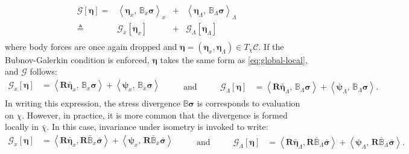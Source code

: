 \begin{equation}
\begin{array}{rccc}
\mathcal{G}\left[\bm{\eta}\right] =& \left< \bm{\eta}_x, \, \mathbb{B}_x \bm{\sigma}\right>_x &+& \left< \bm{\eta}_{\scriptscriptstyle{\Lambda}}, \, \mathbb{B}_{\scriptscriptstyle{\Lambda}} \bm{\sigma}\right>_{\scriptscriptstyle{\Lambda}} \\ %
\triangleq& \mathcal{G}_x[\bm{\eta}_x] &+& \mathcal{G}_{\scriptscriptstyle{\Lambda}}[\bm{\eta}_{\scriptscriptstyle{\Lambda}}] \\ %
\end{array}
\label{eq:galerkin-split}
\end{equation} 
where body forces are once again dropped and 
\(\bm{\eta} = (\bm{\eta}_x, \bm{\eta}_{\scriptscriptstyle{\Lambda}})\in T^{}_\chi \mathscr{C}\).
If the Bubnov-Galerkin condition is enforced, \(\bm{\eta}\) takes the
same form as \eqref{eq:global-local}, and \(\mathcal{G}\) follows: %
\begin{equation*} 
 \begin{aligned}
 \mathcal{G}_x[\bm{\eta}] &=  \left\langle\bm{R} \bar{\bm{\eta}}_x ,\, \mathbb{B}_x \bm{\sigma} \right\rangle + \left\langle \bm{\psi}_x ,\, \mathbb{B}_x \bm{\sigma}\right\rangle \\
\end{aligned}
\qquad\text{ and }\qquad
\begin{aligned}
 \mathcal{G}_{\scriptscriptstyle{\Lambda}}[\bm{\eta}]&= \left\langle\bm{R} \bar{\bm{\eta}}_{\scriptscriptstyle{\Lambda}} ,\, \mathbb{B}_{\scriptscriptstyle{\Lambda}} \bm{\sigma} \right\rangle + \left\langle \bm{\psi}_{\scriptscriptstyle{\Lambda}} ,\, \mathbb{B}_{\scriptscriptstyle{\Lambda}} \bm{\sigma}\right\rangle .
 \end{aligned}
\end{equation*}
In writing this expression, the stress divergence
\(\mathbb{B}\bm{\sigma}\) is corresponds to evaluation on
\(\chi\). However, in practice, it is more common that the divergence is formed locally in \(\bar{\chi}\). In this case,  
invariance under isometry is invoked to write:
%
\begin{equation*} 
\begin{aligned}
\mathcal{G}_x[\bm{\eta}] &=  \left\langle\bm{R} \bar{\bm{\eta}}_x, \bm{R} \bar{\mathbb{B}}_{x} \bar{\bm{\sigma}} \right\rangle + \left\langle \bm{\psi}_x ,\, \bm{R}\bar{\mathbb{B}}_{x} \bar{\bm{\sigma}}\right\rangle \\
\end{aligned}
\qquad\text{ and }\qquad
\begin{aligned}
\mathcal{G}_{\scriptscriptstyle{\Lambda}}[\bm{\eta}]
&= \left\langle\bm{R} \bar{\bm{\eta}}_{\scriptscriptstyle{\Lambda}}, \bm{R} \bar{\mathbb{B}}_{\scriptscriptstyle{\Lambda}} \bar{\bm{\sigma}} \right\rangle 
 + \left\langle \bm{\psi}_{\scriptscriptstyle{\Lambda}} ,\, \bm{R} \bar{\mathbb{B}}_{\scriptscriptstyle{\Lambda}} \bar{\bm{\sigma}}\right\rangle .
\end{aligned}
\end{equation*}
